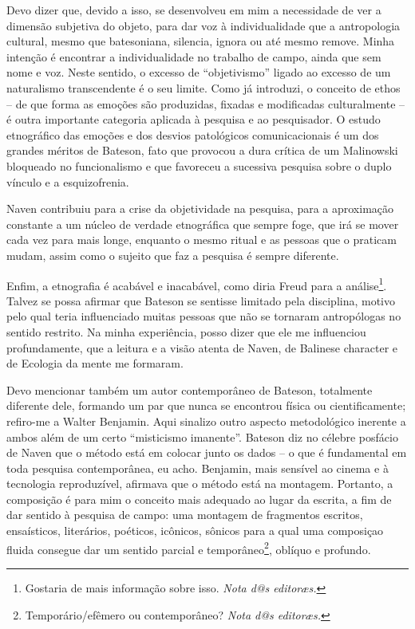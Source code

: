 \documentclass[a4paper, 12pt]{article} %
\makeatletter
\newcommand{\ftnt}[1]{\footnote{#1 \emph{Nota d@s editoræs.}}}
\makeatother
\begin{document}
Devo dizer que, devido a isso, se desenvolveu em mim a necessidade de ver a dimensão subjetiva do objeto, para dar voz à individualidade que a antropologia cultural, mesmo que batesoniana, silencia, ignora ou até mesmo remove. Minha intenção é encontrar a individualidade no trabalho de campo, ainda que sem nome e voz. Neste sentido, o excesso de “objetivismo” ligado ao excesso de um naturalismo transcendente é o seu limite. Como já introduzi, o conceito de ethos – de que forma as emoções são produzidas, fixadas e modificadas culturalmente – é outra importante categoria aplicada à pesquisa e ao pesquisador. O estudo etnográfico das emoções e dos desvios patológicos comunicacionais é um dos grandes méritos de Bateson, fato que provocou a dura crítica de um Malinowski bloqueado no funcionalismo e que favoreceu a sucessiva pesquisa sobre o duplo vínculo e a esquizofrenia.

Naven contribuiu para a crise da objetividade na pesquisa, para a aproximação constante a um núcleo de verdade etnográfica que sempre foge, que irá se mover cada vez para mais longe, enquanto o mesmo ritual e as pessoas que o praticam mudam, assim como o sujeito que faz a pesquisa é sempre diferente.

Enfim, a etnografia é acabável e inacabável, como diria Freud para a análise\ftnt{Gostaria de mais informação sobre isso.}. Talvez se possa afirmar que Bateson se sentisse limitado pela disciplina, motivo pelo qual teria influenciado muitas pessoas que não se tornaram antropólogas no sentido restrito. Na minha experiência, posso dizer que ele me influenciou profundamente, que a leitura e a visão atenta de Naven, de Balinese character e de Ecologia da mente me formaram.

Devo mencionar também um autor contemporâneo de Bateson, totalmente diferente dele, formando um par que nunca se encontrou física ou cientificamente; refiro-me a Walter Benjamin. Aqui sinalizo outro aspecto metodológico inerente a ambos além de um certo “misticismo imanente”. Bateson diz no célebre posfácio de Naven que o método está em colocar junto os dados – o que é fundamental em toda pesquisa contemporânea, eu acho. Benjamin, mais sensível ao cinema e à tecnologia reproduzível, afirmava que o método está na montagem. Portanto, a composição é para mim o conceito mais adequado ao lugar da escrita, a fim de dar sentido à pesquisa de campo: uma montagem de fragmentos escritos, ensaísticos, literários, poéticos, icônicos, sônicos para a qual uma composiçao fluida consegue dar um sentido parcial e temporâneo\ftnt{Temporário/efêmero ou contemporâneo?}, oblíquo e profundo. 
\end{document}
